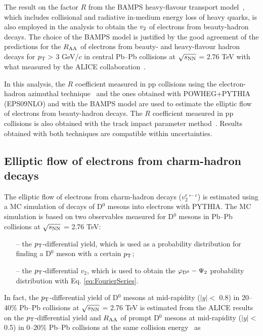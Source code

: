 \documentclass[11pt,a4paper]{article}
\providecommand{\raa}{$R_{\rm{\rm AA}}$ }
\providecommand{\vtwo}{$v_{\rm 2}$ }
\providecommand{\snn}{$\sqrt{s_{\rm NN}}$ }
\begin{document}
The result on the factor $R$ from the BAMPS heavy-flavour transport model~\cite{Uphoff:2014hza,Uphoff:2012gb}, which includes  collisional and radiative in-medium energy loss of heavy quarks, is also employed in the analysis to obtain the \vtwo of electrons from beauty-hadron decays. The choice of the BAMPS model  is justified by the good agreement of the predictions for the \raa of electrons from beauty- and heavy-flavour hadron decays  for $p_{\rm T} > $ 3 GeV/$c$ in central  Pb--Pb collisions at \snn = 2.76 TeV with what measured by the ALICE collaboration~\cite{HFERAA,Adam:2016wyz}.


In this analysis, the  $R$ coefficient measured in pp collisions using the electron-hadron azimuthal technique~\cite{Abelev:2014hla,2016507} and the ones obtained with POWHEG+PYTHIA  (EPS09NLO) and with the BAMPS model are used to estimate the elliptic flow of electrons from beauty-hadron decays. The $R$ coefficient measured in pp collisions is also obtained with the track impact parameter method~\cite{Abelev:2014hla,2016507}. Results obtained with both techniques are compatible within uncertainties.


\subsection{Elliptic flow of electrons from charm-hadron decays}
\label{Sec:ElectronFromCharmV2}

The elliptic flow of electrons from charm-hadron decays ($v_{2}^{e \leftarrow c}$) is estimated using a MC simulation  of decays of D$^{0}$ mesons into electrons with PYTHIA. The MC simulation is based on two observables measured for D$^{0}$ mesons in Pb--Pb collisions at \snn = 2.76 TeV: 

\begin{itemize}
\item[--] the  $p_{\rm T}$-differential yield, which is used as a probability distribution  for finding a D$^{0}$ meson with a certain $p_{\rm T}$; 
\item[--] the $p_{\rm T}$-differential $v_{2}$, which is used to obtain the   $\varphi_{\rm{D}^{0}} - \Psi_{2}$ probability distribution with  Eq. \ref{eq:FourierSeries}.
\end{itemize}

In fact, the $p_{\rm T}$-differential yield of D$^{0}$ mesons  at mid-rapidity ($|y| <$ 0.8) in 20--40\% Pb--Pb collisions at \snn = 2.76 TeV is estimated from the ALICE results on the $p_{\rm T}$-differential yield  and \raa  of  prompt D$^{0}$ mesons at mid-rapidity ($|y| <$ 0.5) in 0--20\% Pb--Pb collisions at the same collision energy~\cite{ALICEDRPbPb} as 
\end{document}
